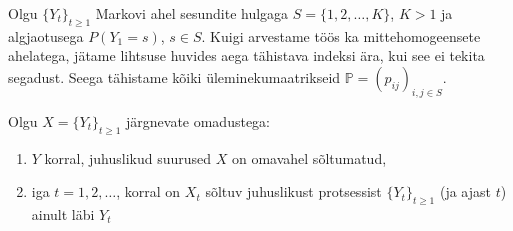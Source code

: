 Olgu $\{Y_t\}_{t\geq1}$ Markovi ahel sesundite hulgaga $S = \{1,2,\dots,K\}$, $K>1$ ja algjaotusega $P(Y_1=s)$, $s \in S$. Kuigi arvestame töös ka mittehomogeensete ahelatega, jätame lihtsuse huvides aega tähistava indeksi ära, kui see ei tekita segadust. Seega tähistame kõiki üleminekumaatrikseid $\mathbb{P} = (p_{ij})_{i,j \in S}$.

Olgu $X = \{Y_t\}_{t\geq1}$ järgnevate omadustega:

\begin{enumerate}
  \item $Y$ korral, juhuslikud suurused $X$ on omavahel sõltumatud,
  \item iga $t = 1,2,\dots$, korral on $X_t$ sõltuv juhuslikust protsessist $\{Y_t\}_{t\geq1}$ (ja ajast $t$) ainult läbi $Y_t$
\end{enumerate}
